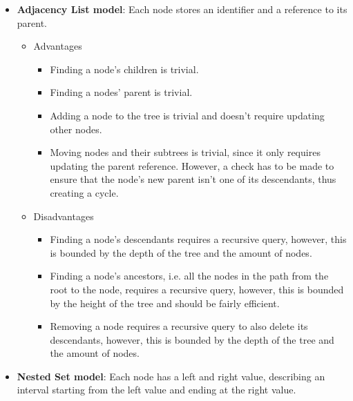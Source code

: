 \begin{itemize}[nolistsep]
	\item \textbf{Adjacency List model}: Each node stores an identifier and a reference to its parent.
	      \begin{itemize}
		      \item Advantages
		            \begin{itemize}
			            \item Finding a node's children is trivial.
			            \item Finding a nodes' parent is trivial.
			            \item Adding a node to the tree is trivial and doesn't require updating other
			                  nodes.
			            \item Moving nodes and their subtrees is trivial, since it only requires updating
			                  the parent reference. However, a check has to be made to ensure that the node's
			                  new parent isn't one of its descendants, thus creating a cycle.
		            \end{itemize}
		      \item Disadvantages
		            \begin{itemize}
			            \item Finding a node's descendants requires a recursive query, however,
			                  this is bounded by the depth of the tree and the amount of nodes.
			            \item Finding a node's ancestors, i.e. all the nodes in the path from the root to
			                  the node, requires a recursive query, however, this is bounded by the height of
			                  the tree and should be fairly efficient.
			            \item Removing a node requires a recursive query to also delete its descendants,
			                  however, this is bounded by the depth of
			                  the tree and the amount of nodes.
		            \end{itemize}
	      \end{itemize}
	\item \textbf{Nested Set model}: Each node has a left and right value, describing an
	      interval starting from the left value and ending at the right value.

\end{itemize}
